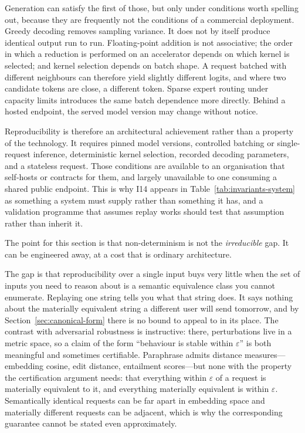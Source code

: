 Generation can satisfy the first of those, but only under conditions worth
spelling out, because they are frequently not the conditions of a commercial
deployment. Greedy decoding removes sampling variance. It does not by itself produce
identical output run to run. Floating-point addition is not associative; the order in
which a reduction is performed on an accelerator depends on which kernel is selected;
and kernel selection depends on batch shape. A request batched with different
neighbours can therefore yield slightly different logits, and where two candidate
tokens are close, a different token. Sparse expert routing under capacity limits
introduces the same batch dependence more directly. Behind a hosted endpoint, the
served model version may change without notice.

Reproducibility is therefore an architectural achievement rather than a property of
the technology. It requires pinned model versions, controlled batching or
single-request inference, deterministic kernel selection, recorded decoding
parameters, and a stateless request. Those conditions are available to an
organisation that self-hosts or contracts for them, and largely unavailable to one
consuming a shared public endpoint. This is why I14 appears in
Table~\ref{tab:invariants-system} as something a system must supply rather than
something it has, and a validation programme that assumes replay works should test
that assumption rather than inherit it.

The point for this section is that non-determinism is not the \emph{irreducible}
gap. It can be engineered away, at a cost that is ordinary architecture.

The gap is that reproducibility over a single input buys very little when the set of
inputs you need to reason about is a semantic equivalence class you cannot
enumerate. Replaying one string tells you what that string does. It says nothing
about the materially equivalent string a different user will send tomorrow, and by
Section~\ref{sec:canonical-form} there is no bound to appeal to in its place. The
contrast with adversarial robustness is instructive: there, perturbations live in a
metric space, so a claim of the form ``behaviour is stable within $\varepsilon$'' is
both meaningful and sometimes certifiable. Paraphrase admits distance measures---
embedding cosine, edit distance, entailment scores---but none with the property the
certification argument needs: that everything within $\varepsilon$ of a request is
materially equivalent to it, and everything materially equivalent is within
$\varepsilon$. Semantically identical requests can be far apart in embedding space
and materially different requests can be adjacent, which is why the corresponding
guarantee cannot be stated even approximately.

